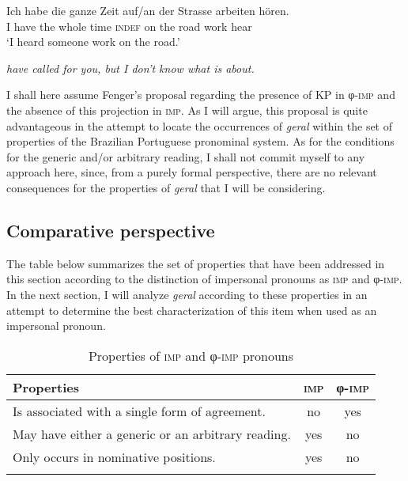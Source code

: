 \documentclass[output=paper]{langscibook}
\begin{document}
\ea\label{ex:avelar:18}
 \ea\label{ex:avelar:18a}  
  \gll Ich  habe   die ganze   Zeit {} auf/an der Strasse  arbeiten hören.\\
         I   have   the whole   time \textsc{indef} on the road       work hear\\
 \glt ‘I heard someone work on the road.’

 \ex\label{ex:avelar:18b} \textit{ {have called for you, but I don’t know what is about.}}\\
\z 
\z

{I shall here assume Fenger’s proposal regarding the presence of KP in φ-\textsc{imp} and the absence of this projection in \textsc{imp}. As I will argue, this proposal is quite advantageous in the attempt to locate the occurrences of} \textit{geral} {within the set of properties of the Brazilian Portuguese pronominal system. As for the conditions for the generic and/or arbitrary reading, I shall not commit myself to any approach here, since, from a purely formal perspective, there are no relevant consequences for the properties of} \textit{geral} {that I will be considering.}


\subsection{Comparative perspective}\label{sec:avelar:3.3}


{The table below summarizes the set of properties that have been addressed in this section according to the distinction of impersonal pronouns as \textsc{imp} and φ-\textsc{imp}. In the next section, I will analyze} \textit{geral} {according to these properties in an attempt to determine the best   characterization of this item when used as an impersonal pronoun.}


\begin{table}
\begin{tabular}{lcc}

\lsptoprule

{Properties} & \textsc{imp} & {{φ-\textsc{imp}}}\\
\midrule
{Is associated with a single form of agreement.} & { no} & { yes}\\
{May have either a generic or an arbitrary reading.} & { yes} & { no}\\
{Only occurs in nominative positions.} & { yes} & { no}\\
\lspbottomrule
\end{tabular}
\caption{Properties of \textsc{imp} and φ-\textsc{imp} pronouns\label{tab:avelar:1}}
\end{table}
\end{document}
